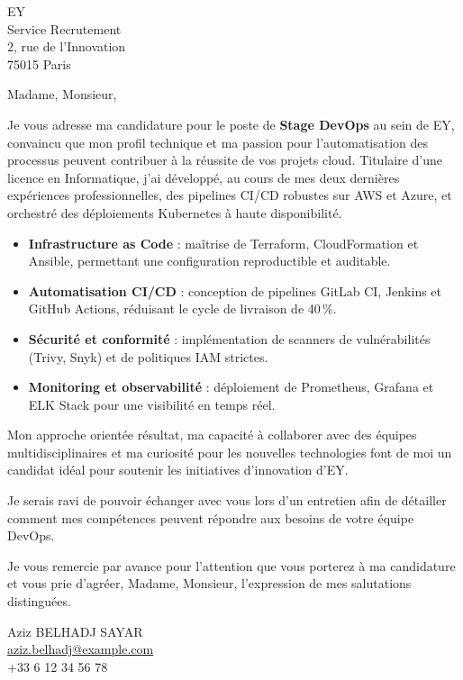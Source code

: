 \documentclass[11pt,a4paper]{letter}
\newcommand{\CandidateName}{Aziz BELHADJ SAYAR}
\newcommand{\CompanyName}{EY}
\newcommand{\Position}{Stage DevOps}
\begin{document}
\begin{letter}{\CompanyName \\ Service Recrutement \\ 2, rue de l’Innovation \\ 75015 Paris}

\opening{Madame, Monsieur,}

Je vous adresse ma candidature pour le poste de \textbf{\Position} au sein de \CompanyName, convaincu que mon profil technique et ma passion pour l’automatisation des processus peuvent contribuer à la réussite de vos projets cloud.  
Titulaire d’une licence en Informatique, j’ai développé, au cours de mes deux dernières expériences professionnelles, des pipelines CI/CD robustes sur AWS et Azure, et orchestré des déploiements Kubernetes à haute disponibilité.  

\begin{itemize}[leftmargin=*, label={--}]
\item \textbf{Infrastructure as Code} : maîtrise de Terraform, CloudFormation et Ansible, permettant une configuration reproductible et auditable.
\item \textbf{Automatisation CI/CD} : conception de pipelines GitLab CI, Jenkins et GitHub Actions, réduisant le cycle de livraison de 40 \%.
\item \textbf{Sécurité et conformité} : implémentation de scanners de vulnérabilités (Trivy, Snyk) et de politiques IAM strictes.
\item \textbf{Monitoring et observabilité} : déploiement de Prometheus, Grafana et ELK Stack pour une visibilité en temps réel.
\end{itemize}

Mon approche orientée résultat, ma capacité à collaborer avec des équipes multidisciplinaires et ma curiosité pour les nouvelles technologies font de moi un candidat idéal pour soutenir les initiatives d’innovation d’EY.  

Je serais ravi de pouvoir échanger avec vous lors d’un entretien afin de détailler comment mes compétences peuvent répondre aux besoins de votre équipe DevOps.  

Je vous remercie par avance pour l’attention que vous porterez à ma candidature et vous prie d’agréer, Madame, Monsieur, l’expression de mes salutations distinguées.  

\closing{\CandidateName \\ \href{mailto:aziz.belhadj@example.com}{aziz.belhadj@example.com} \\ +33 6 12 34 56 78}

\end{letter}
\end{document}

